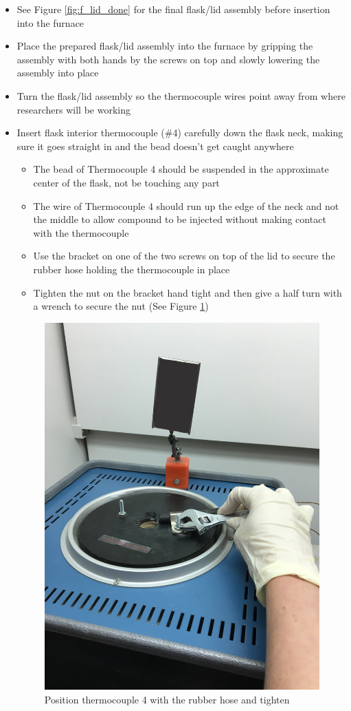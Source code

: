 \documentclass[letterpaper,11pt]{article}
\begin{document}
\begin{itemize}
\begin{itemize}
        \item See Figure \ref{fig:f_lid_done} for the final flask/lid
            assembly before insertion into the furnace
        \item Place the prepared flask/lid assembly into the furnace by gripping
            the assembly with both hands by the screws on top and slowly 
            lowering the assembly into place
        \item Turn the flask/lid assembly so the thermocouple wires point away 
            from where researchers will be working
        \item Insert flask interior thermocouple (\#4) carefully down the flask 
            neck, making sure it goes straight in and the bead doesn't get 
            caught anywhere
                \begin{itemize}
                \item The bead of Thermocouple 4 should be suspended in the 
                    approximate center of the flask, not be touching any part
                \item The wire of Thermocouple 4 should run up the edge of the 
                    neck and not the middle to allow compound to be injected 
                    without making contact with the thermocouple
                \item Use the bracket on one of the two screws on top of the 
                    lid to secure the rubber hose holding the thermocouple
                    in place
                \item Tighten the nut on the bracket hand tight and then give a 
                    half turn with a wrench to secure the nut (See Figure 
                    \ref{fig:wrench_tight})
                \end{itemize}

\begin{figure}[H]
\centering
\includegraphics[width=.35\textwidth]{top_of_furnace_w_wrench.jpg}
\caption{Position thermocouple 4 with the rubber hose and tighten}
\label{fig:wrench_tight}
\end{figure}


\end{itemize}
\end{itemize}
\end{document}
